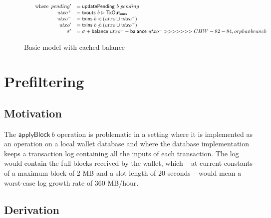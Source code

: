 \documentclass{article}
\newcommand{\restrictdom}{\lhd}
\newcommand{\subtractdom}{\mathbin{\slashed{\restrictdom}}}
\newcommand{\restrictrange}{\rhd}
\theoremstyle{definition}{
  \newtheorem{lemma}{Lemma}[section] %
  \newtheorem{definition}[lemma]{Definition}
}
\theoremstyle{theorem}{
  \newtheorem{invariant}[lemma]{Invariant}
  \newtheorem{proofobligation}[lemma]{Proof Obligation}
}
\numberwithin{equation}{lemma}
\begin{document}
\begin{figure}[p]
\begin{align*}
& \qquad \text{where}
  \begin{array}[t]{rl}
    pending^\prime & = \mathsf{updatePending} ~ b ~ pending \\
    utxo^+ & = \mathsf{txouts} ~ b \restrictrange \mathsf{TxOut_{ours}} \\
    utxo^- & = \mathsf{txins} ~ b \restrictdom (utxo \cup utxo^+) \\
    utxo^\prime & = \mathsf{txins} ~ b \subtractdom (utxo \cup utxo^+) \\
    \sigma^\prime & = \sigma + \mathsf{balance} ~ utxo^+ - \mathsf{balance} ~ utxo^-
>>>>>>> CHW-82-84, orphan branch
  \end{array}
\end{align*}
%
\caption{\label{fig:model_with_cached_balance}Basic model with cached balance}
\end{figure}

\section{Prefiltering}
\label{sec:prefiltering}

\subsection{Motivation}

The $\mathsf{applyBlock} ~ b$ operation is problematic in a setting where it is
implemented as an operation on a local wallet database and where the database
implementation keeps a transaction log containing all the inputs of each
transaction. The log would contain the full blocks received
by the wallet, which -- at current constants of a maximum block of 2 MB and a slot
length of 20 seconds -- would mean a worst-case log growth rate of 360 MB/hour.

\subsection{Derivation}
\end{document}
